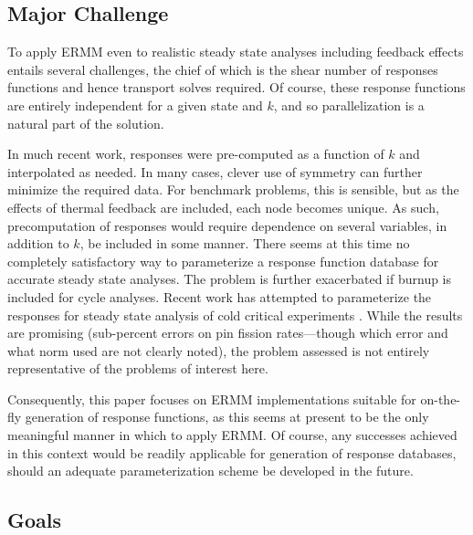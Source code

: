 \subsection{Major Challenge}

To apply ERMM even to realistic steady state analyses including 
feedback effects entails several challenges, the chief of which is 
the shear number of responses functions and hence transport solves 
required.  Of course, these response functions are entirely independent
for a given state and $k$, and so parallelization is a natural part of 
the solution.  

In much recent work, responses were pre-computed as a function of 
$k$ and interpolated as needed.  In many cases, clever use of symmetry 
can further minimize the required data.  For benchmark problems, this is 
sensible, but as the effects of thermal feedback are included, each 
node becomes unique.  As such, precomputation of responses would require  
dependence on several variables, in addition to $k$, be included in some
manner. There seems 
at this time no completely satisfactory way to parameterize a response 
function database for accurate steady state analyses.  The problem is further 
exacerbated if burnup is included for cycle analyses.  Recent
work has attempted to parameterize the responses for steady state 
analysis of cold critical experiments \cite{hino2012bwr}.  While the results
are promising (sub-percent errors on pin fission rates---though which 
error and what norm used are not clearly noted), the problem assessed is not 
entirely representative of the problems of interest here.  

Consequently,  this paper focuses on ERMM 
implementations suitable for on-the-fly generation of response functions, 
as this seems at present to be the only meaningful manner in which to
apply ERMM.  Of course, any successes achieved in this context 
would be readily applicable for generation of response databases, should 
an adequate parameterization scheme be developed in the future.

\subsection{Goals}

